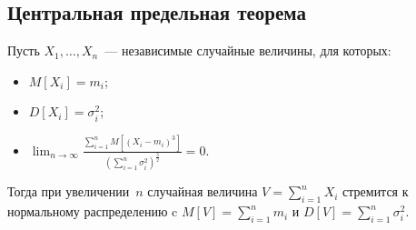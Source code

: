 \subsection{Центральная предельная теорема}
 
\begin{theorem}
Пусть $X_1, \ldots, X_n$~--- независимые случайные величины, для которых:
\begin{itemize}
	\item $M\left[X_i\right] = m_i$;
	\item $D\left[X_i\right] = \sigma_i^2$;
	\item $\displaystyle \lim_{n \to \infty} \frac{\sum\limits_{i=1}^n M\left[(X_i - m_i)^3\right]}{\left(\sum\limits_{i=1}^n \sigma_i^2\right)^{\frac32}} = 0$.
\end{itemize}
Тогда при увеличении~$n$ случайная величина $V = \sum\limits_{i=1}^n X_i$ стремится к нормальному распределению c $M[V] = \sum\limits_{i=1}^n m_i$ и $D[V] = \sum\limits_{i=1}^n \sigma_i^2$.
\end{theorem}
